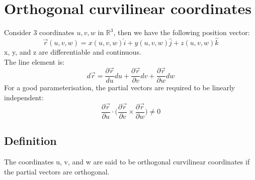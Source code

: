 \documentclass[a4paper, 11pt, normalem]{report}
\newcommand\p{\partial}
\newcommand\vr{\vec{r}}
\begin{document}
\section{Orthogonal curvilinear coordinates}
Consider 3 coordinates $u, v, w$ in $\mathbb{R}^3$, then we have the following position vector:
\begin{equation*}
    \vr(u,v,w) = x(u,v,w)\hat{i} + y(u,v,w)\hat{j} + z(u,v,w)\hat{k}
\end{equation*}
x, y, and z are differentiable and continuous. \\
The line element is:
\begin{equation*}
    d\vr = \frac{\p \vr}{du}du + \frac{\p \vr}{\p v}dv + \frac{\p \vr}{\p w}dw
\end{equation*}
For a good parameterisation, the partial vectors are required to be linearly independent:
\begin{equation*}
    \frac{\p \vr}{\p u} \cdot \Big(\frac{\p \vr}{\p v} \times \frac{\p \vr}{\p w} \Big) \neq 0
\end{equation*}

\subsection{Definition}
The coordinates u, v, and w are said to be orthogonal curvilinear coordinates if the partial vectors are orthogonal.
\end{document}
